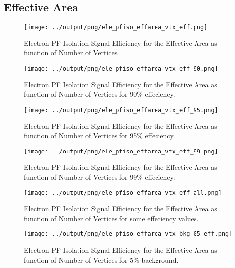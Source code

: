 \documentclass[11pt]{book}
\begin{document}
\subsection{Effective Area}
\begin{figure}[htb]
\centering
\texttt{[image: ../output/png/ele\_pfiso\_effarea\_vtx\_eff.png]}
\caption{Electron PF Isolation Signal Efficiency for the Effective Area as function of Number of Vertices.}
\label{fig:ele_pfiso_vtx_eff_effarea}
\end{figure}

\begin{figure}[htb]
\centering
\texttt{[image: ../output/png/ele\_pfiso\_effarea\_vtx\_eff\_90.png]}
\caption{Electron PF Isolation Signal Efficiency for the Effective Area as function of Number of Vertices for 90\% effeciency.}
\label{fig:ele_pfiso_vtx_eff_effarea_eff_90}
\end{figure}

\begin{figure}[htb]
\centering
\texttt{[image: ../output/png/ele\_pfiso\_effarea\_vtx\_eff\_95.png]}
\caption{Electron PF Isolation Signal Efficiency for the Effective Area as function of Number of Vertices for 95\% effeciency.}
\label{fig:ele_pfiso_vtx_eff_effarea_eff_95}
\end{figure}

\begin{figure}[htb]
\centering
\texttt{[image: ../output/png/ele\_pfiso\_effarea\_vtx\_eff\_99.png]}
\caption{Electron PF Isolation Signal Efficiency for the Effective Area as function of Number of Vertices for 99\% effeciency.}
\label{fig:ele_pfiso_vtx_eff_effarea_eff_99}
\end{figure}

\begin{figure}[htb]
\centering
\texttt{[image: ../output/png/ele\_pfiso\_effarea\_vtx\_eff\_all.png]}
\caption{Electron PF Isolation Signal Efficiency for the Effective Area as function of Number of Vertices for some effeciency values.}
\label{fig:ele_pfiso_vtx_eff_effarea_eff_all}
\end{figure}

\begin{figure}[htb]
\centering
\texttt{[image: ../output/png/ele\_pfiso\_effarea\_vtx\_bkg\_05\_eff.png]}
\caption{Electron PF Isolation Signal Efficiency for the Effective Area as function of Number of Vertices for 5\% background.}
\label{fig:ele_pfiso_vtx_eff_effarea_bkg_05_eff}
\end{figure}
\end{document}
